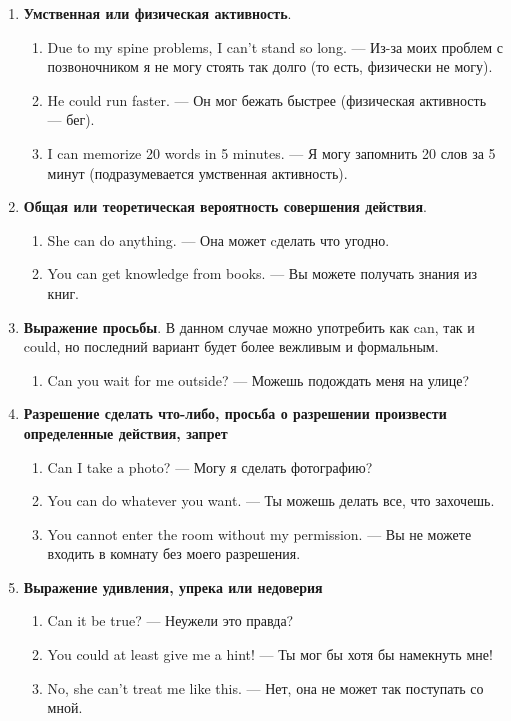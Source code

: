 \documentclass{article}
\begin{document}
\begin{enumerate}
	\item \textbf{Умственная или физическая активность}.
	\begin{enumerate}
		\item Due to my spine problems, I can’t stand so long. — Из-за моих проблем с позвоночником я не могу стоять так долго (то есть, физически не могу).
		\item He could run faster. — Он мог бежать быстрее (физическая активность — бег).
		\item I can memorize 20 words in 5 minutes. — Я могу запомнить 20 слов за 5 минут (подразумевается умственная активность).
	\end{enumerate}
	 \item \textbf{Общая или теоретическая вероятность совершения действия}.
	 \begin{enumerate}
	 	\item She can do anything. — Она может cделать что угодно.
	 	\item You can get knowledge from books. — Вы можете получать знания из книг.
	 \end{enumerate}	 
	 \item \textbf{Выражение просьбы}. В данном случае можно употребить как can, так и could, но последний вариант будет более вежливым и формальным.
	 \begin{enumerate}
	 	\item Can you wait for me outside? — Можешь подождать меня на улице? 
	 \end{enumerate}
	 \item \textbf{Разрешение сделать что-либо, просьба о разрешении произвести определенные действия, запрет}
	 \begin{enumerate}
	 	\item Can I take a photo? — Могу я сделать фотографию? 
	 	\item You can do whatever you want. — Ты можешь делать все, что захочешь. 
	 	\item You cannot enter the room without my permission. — Вы не можете входить в комнату без моего разрешения.
	 \end{enumerate}
	 \item \textbf{Выражение удивления, упрека или недоверия}
	 \begin{enumerate}
	 	\item Can it be true? — Неужели это правда? 
	 	\item You could at least give me a hint! — Ты мог бы хотя бы намекнуть мне! 
	 	\item No, she can’t treat me like this. — Нет, она не может так поступать со мной. 
	 \end{enumerate}
\end{enumerate}
\end{document}
